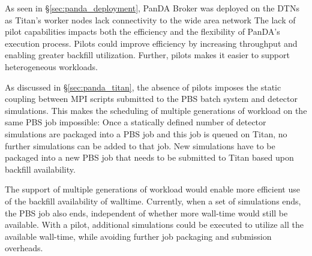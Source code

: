 

As seen in \S\ref{sec:panda_deployment}, PanDA Broker was  deployed on the
DTNs as Titan's worker nodes lack connectivity to the wide area network The
lack of pilot capabilities impacts both the efficiency and the flexibility of
PanDA's execution process. Pilots could improve efficiency by increasing
throughput and enabling greater backfill utilization. Further, pilots makes it
easier to support heterogeneous workloads.

As discussed in \S\ref{sec:panda_titan}, the absence of pilots imposes the
static coupling between MPI scripts submitted to the PBS batch system and
detector simulations. This makes the scheduling of multiple generations of
workload on the same PBS job impossible: Once a statically defined number of
detector simulations are packaged into a PBS job and this job is queued on
Titan, no further simulations can be added to that job. New simulations have
to be packaged into a new PBS job that needs to be submitted to Titan based
upon backfill availability.

The support of  multiple generations of workload would enable more efficient
use of the backfill availability of walltime. Currently, when a set of
simulations ends, the PBS job also ends, independent of whether more wall-time
would still be available. With a pilot, additional simulations could be
executed  to utilize all the available wall-time, while avoiding further job
packaging and submission overheads.


